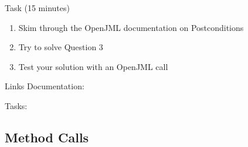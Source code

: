 \begin{frame}{\insertsubsection}
	
	\begin{fancycolumns}
		
		\begin{definition}{Task (15 minutes)}
			
			\begin{enumerate}
				\item Skim through the OpenJML documentation on Postconditions
				\item Try to solve Question 3
				\item Test your solution with an OpenJML call
			\end{enumerate}
		\end{definition}
		
		\nextcolumn
		
		\begin{example}{Links}
			Documentation: 
			\begin{center}
				\centering{}
			\end{center}
			
			
			Tasks: 
			\begin{center}
				\centering{}
			\end{center}
		\end{example}
		
	\end{fancycolumns}
\end{frame}

\subsection{Method Calls}

